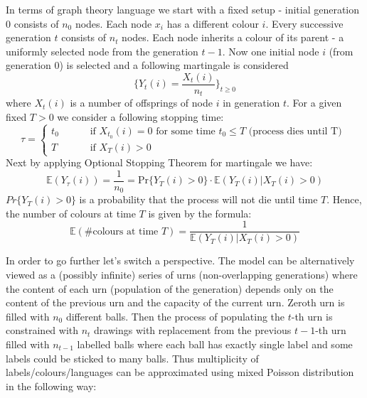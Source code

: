 In terms of graph theory language we start with a fixed setup - initial generation $0$ consists of $n_0$ nodes. Each node $x_i$ has a different colour $i$. Every successive generation $t$ consists of $n_t$ nodes. Each node inherits a colour of its parent - a uniformly selected node from the generation $t-1$. 
Now one initial node $i$ (from generation $0$) is selected and a following martingale is considered 
\begin{equation}
\{Y_t(i)=\frac{X_t(i)}{n_t}\}_{t\geq0}
\end{equation}
where $X_t(i)$ is a number of offsprings of node $i$ in generation $t$. For a given fixed $T>0$ we consider a following stopping time:
\begin{equation}
\tau=\begin{cases} t_0 &\qquad \mbox{ if } X_{t_0}(i)=0 \mbox{ for some time } t_0 \leq T \mbox{ (process dies until T) }\\ T &\qquad \mbox{ if } X_{T}(i)>0\end{cases}
\end{equation}
Next by applying Optional Stopping Theorem for martingale we have:
\begin{equation}
\mathbb{E}(Y_{\tau}(i))=\frac{1}{n_0}=\mbox{Pr}\{Y_T(i)>0\}\cdot\mathbb{E}(Y_{T}(i) | X_{T}(i)>0)
\end{equation}
$Pr\{Y_T(i)>0\}$ is a probability that the process will not die until time $T$. Hence, the number of colours at time $T$ is given by the formula:
\begin{equation}
\mathbb{E}(\mbox{\# colours at time } T)=\frac{1}{\mathbb{E}(Y_T(i) | X_T(i) >0)}
\end{equation}

In order to go further let’s switch a perspective.
The model can be alternatively viewed as a (possibly infinite) series of urns (non-overlapping generations) where the content of each urn (population of the generation) depends only on the content of the previous urn and the capacity of the current urn. Zeroth urn is filled with $n_0$ different balls. Then the process of populating the $t$-th urn is constrained with $n_t$ drawings with replacement from the previous $t-1$-th urn filled with $n_{t-1}$ labelled balls where each ball has exactly single label and some labels could be sticked to many balls. Thus multiplicity of labels/colours/languages can be approximated using mixed Poisson distribution in the following way:

